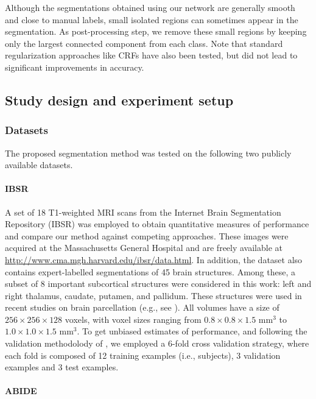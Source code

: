 \documentclass[twoside,fleqn,espcrc2]{elsarticle}
\begin{document}
Although the segmentations obtained using our network are generally smooth and close to manual labels, small isolated regions can sometimes appear in the segmentation. As post-processing step, we remove these small regions by keeping only the largest connected component from each class. Note that standard regularization approaches like CRFs \cite{lafferty2001conditional} have also been tested, but did not lead to significant improvements in accuracy.

\subsection{Study design and experiment setup}
\label{ssec:experiments}


\subsubsection{Datasets}
\label{sssec:dataset}

The proposed segmentation method was tested on the following two publicly available datasets.

\paragraph{\textbf{IBSR}}

A set of 18 T1-weighted MRI scans from the Internet Brain Segmentation Repository (IBSR) was employed to obtain quantitative measures of performance and compare our method against competing approaches. These images were acquired at the Massachusetts General Hospital and are freely available at \url{http://www.cma.mgh.harvard.edu/ibsr/data.html}. In addition, the dataset also contains expert-labelled segmentations of 45 brain structures. Among these, a subset of 8 important subcortical structures were considered in this work: left and right thalamus, caudate, putamen, and pallidum. These structures were used in recent studies on brain parcellation (e.g., see \cite{shakeri2016sub}). All volumes have a size of $256\!\times\!256\!\times\!128$ voxels, with voxel sizes ranging from $0.8\!\times\!0.8\!\times\!1.5 \textrm{ mm}^3$ to $1.0 \!\times\!1.0\!\times\!1.5 \textrm{ mm}^3$.  To get unbiased estimates of performance, and following the validation methodolody of \cite{shakeri2016sub}, we employed a 6-fold cross validation strategy, where each fold is composed of 12 training examples (i.e., subjects), 3 validation examples and 3 test examples.

\paragraph{\textbf{ABIDE}}
\end{document}
